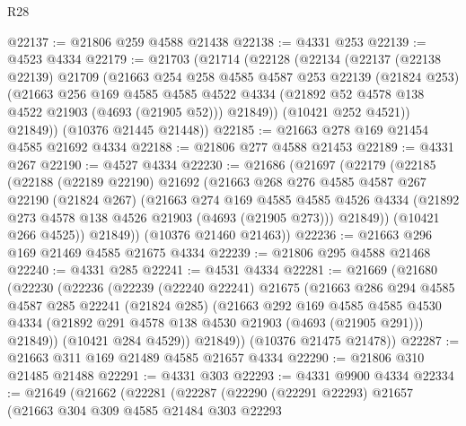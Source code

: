 \begin{lexlean}{R28}
\begin{coremodule}
@22137 := @21806 @259 @4588 @21438
@22138 := @4331 @253
@22139 := @4523 @4334
@22179 := @21703
    (@21714
      (@22128
        (@22134
          (@22137
            (@22138 @22139)
            @21709
            (@21663
              @254
              @258
              @4585
              @4587
              @253
              @22139
              (@21824 @253)
              (@21663
                @256
                @169
                @4585
                @4585
                @4522
                @4334
                (@21892 @52 @4578 @138 @4522 @21903 (@4693 (@21905 @52)))
                @21849))
            (@10421 @252 @4521))
          @21849))
      (@10376 @21445 @21448))
@22185 := @21663 @278 @169 @21454 @4585 @21692 @4334
@22188 := @21806 @277 @4588 @21453
@22189 := @4331 @267
@22190 := @4527 @4334
@22230 := @21686
    (@21697
      (@22179
        (@22185
          (@22188
            (@22189 @22190)
            @21692
            (@21663
              @268
              @276
              @4585
              @4587
              @267
              @22190
              (@21824 @267)
              (@21663
                @274
                @169
                @4585
                @4585
                @4526
                @4334
                (@21892 @273 @4578 @138 @4526 @21903 (@4693 (@21905 @273)))
                @21849))
            (@10421 @266 @4525))
          @21849))
      (@10376 @21460 @21463))
@22236 := @21663 @296 @169 @21469 @4585 @21675 @4334
@22239 := @21806 @295 @4588 @21468
@22240 := @4331 @285
@22241 := @4531 @4334
@22281 := @21669
    (@21680
      (@22230
        (@22236
          (@22239
            (@22240 @22241)
            @21675
            (@21663
              @286
              @294
              @4585
              @4587
              @285
              @22241
              (@21824 @285)
              (@21663
                @292
                @169
                @4585
                @4585
                @4530
                @4334
                (@21892 @291 @4578 @138 @4530 @21903 (@4693 (@21905 @291)))
                @21849))
            (@10421 @284 @4529))
          @21849))
      (@10376 @21475 @21478))
@22287 := @21663 @311 @169 @21489 @4585 @21657 @4334
@22290 := @21806 @310 @21485 @21488
@22291 := @4331 @303
@22293 := @4331 @9900 @4334
@22334 := @21649
    (@21662
      (@22281
        (@22287
          (@22290
            (@22291 @22293)
            @21657
            (@21663
              @304
              @309
              @4585
              @21484
              @303
              @22293

\end{coremodule}
\end{lexlean}

